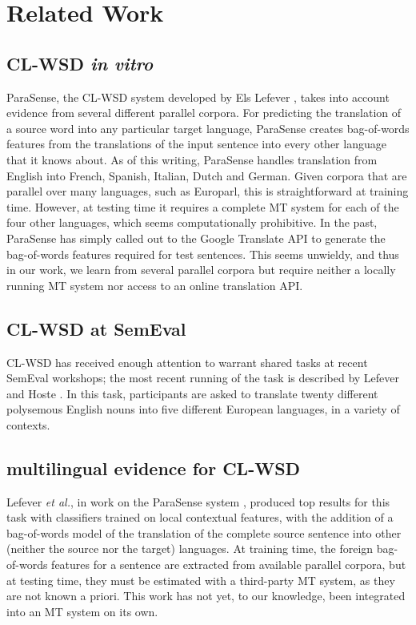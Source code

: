 \chapter{Related Work}

\section{CL-WSD \emph{in vitro}}
ParaSense, the CL-WSD system developed by Els Lefever
\cite{lefever-hoste-decock:2011:ACL-HLT2011}, takes into account evidence from
several different parallel corpora.
For predicting the translation of a source word into
any particular target language, ParaSense creates
bag-of-words features from the translations of the input sentence into every
other language that it knows about. As of this writing, ParaSense handles
translation from English into French, Spanish, Italian, Dutch and German.
Given corpora that are parallel over many languages, such as Europarl, this is
straightforward at
training time. However, at testing time it requires a complete MT system for
each of the four other languages, which seems computationally prohibitive. In
the past, ParaSense has simply called out to the Google Translate API to
generate the bag-of-words features required for test sentences. This seems
unwieldy, and thus in our work, we learn from several parallel corpora but
require neither a locally running MT system nor access to an online translation
API.


\section{CL-WSD at SemEval}
CL-WSD has received enough attention to warrant shared tasks at recent SemEval
workshops; the most recent running of the task is described by Lefever and
Hoste \cite{task10}.
In this task, participants are asked to translate twenty different polysemous
English nouns into five different European languages, in a variety of contexts.


\section{multilingual evidence for CL-WSD}

Lefever \emph{et al.}, in work on the ParaSense system
\cite{lefever-hoste-decock:2011:ACL-HLT2011}, produced top results for
this task with classifiers trained on local contextual features, with the 
addition of a bag-of-words model of the translation of the complete source
sentence into other (neither the source nor the target) languages. At training
time, the foreign bag-of-words features for a sentence are extracted from
available parallel corpora, but at testing time, they must be
estimated with a third-party MT system, as they are not known a priori.
This work has not yet, to our knowledge, been integrated into an MT system
on its own.

